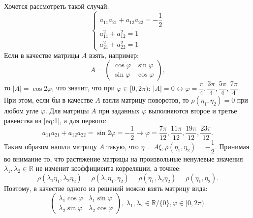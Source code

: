 \documentclass[specialist,
substylefile = spbu_report.rtx,
subf,href,colorlinks=true, 12pt]{disser}
\newcommand{\R}{\mathbb{R}}
\begin{document}
	Хочется рассмотреть такой случай:
	\begin{equation}
		\begin{cases}
			a_{11}a_{21} + a_{12}a_{22} = -\dfrac{1}{2}\\
			a_{11}^2 + a_{12}^2 = 1 \label{eq:1}\\
			a_{21}^2 + a_{22}^2 = 1
		\end{cases}
	\end{equation}
	Если в качестве матрицы $A$ взять, например:
	\begin{equation*}
		A = 
		\begin{pmatrix}
			\cos\varphi & \sin\varphi\\
			\sin\varphi& \cos\varphi
		\end{pmatrix},
	\end{equation*}
	то $|A| = \cos2\varphi$, что значит, что при $\varphi\in[0,2\pi):~|A| = 0 \leftrightarrow \varphi = \dfrac{\pi}{4}, \dfrac{3\pi}{4}, \dfrac{5\pi}{4}, \dfrac{7\pi}{4}$. При этом, если бы в качестве $A$ взяли матрицу поворотов, то $\rho(\eta_1, \eta_2) = 0$ при любом угле $\varphi$. Для матрицы $A$ при заданных $\varphi$ выполняются второе и третье равенства из \eqref{eq:1}, а для первого:
	\begin{equation*}
		a_{11}a_{21}+a_{12}a_{22} = \sin2\varphi = -\dfrac{1}{2}\rightarrow\varphi = \dfrac{7\pi}{12},\dfrac{11\pi}{12},\dfrac{19\pi}{12},\dfrac{23\pi}{12}.	
	\end{equation*}
	Таким образом нашли матрицу $A$ такую, что $\eta = A\xi, \rho(\eta_1, \eta_2) = -\dfrac{1}{2}$. Принимая во внимание то, что растяжение матрицы на произвольные ненулевые значения $\lambda_1,\lambda_2\in\R$ не изменит коэффициента корреляции, а точнее:
	\begin{equation*}
		\rho(\lambda_1\eta_1, \lambda_2\eta_2) = \rho(\lambda_1\eta_1, \eta_2) = \rho(\eta_1, \lambda_2\eta_2) = \rho(\eta_1, \eta_2).
	\end{equation*}
	Поэтому, в качестве одного из решений можно взять матрицу вида:
	\begin{equation*}
		\begin{pmatrix}
			\lambda_1\cos\varphi & \lambda_1\sin\varphi\\
			\lambda_2\sin\varphi& \lambda_2\cos\varphi
		\end{pmatrix},
		~\lambda_1,\lambda_2\in\R/\{0\}, \varphi\in[0, 2\pi).
	\end{equation*}
\end{document}

